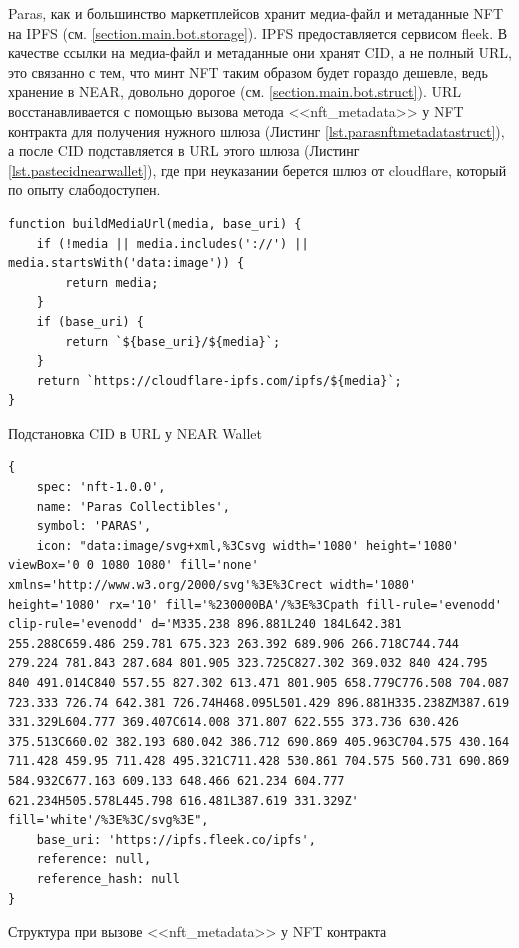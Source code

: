 Paras, как и большинство маркетплейсов хранит медиа-файл и метаданные NFT на IPFS\cite{ipfs} (см. {\color{blue} \ref{section.main.bot.storage}}). IPFS предоставляется сервисом fleek\cite{fleek}. В качестве ссылки на медиа-файл и метаданные они хранят CID, а не полный URL, это связанно с тем, что минт NFT таким образом будет гораздо дешевле, ведь хранение в NEAR, довольно дорогое (см. {\color{blue} \ref{section.main.bot.struct}}). URL восстанавливается с помощью вызова метода <<nft\_metadata>> у NFT контракта для получения нужного шлюза (Листинг {\color{blue}\ref{lst.parasnftmetadatastruct}}), а после CID подставляется в URL этого шлюза (Листинг {\color{blue}\ref{lst.pastecidnearwallet}}), где при неуказании берется шлюз от cloudflare, который по опыту слабодоступен.

\begin{listing}[H]
\begin{verbatim}
function buildMediaUrl(media, base_uri) {
    if (!media || media.includes('://') || media.startsWith('data:image')) {
        return media;
    }
    if (base_uri) {
        return `${base_uri}/${media}`;
    }
    return `https://cloudflare-ipfs.com/ipfs/${media}`;
}
\end{verbatim}
\caption{Подстановка CID в URL у NEAR Wallet\cite{pastecidnearwallet}}
\label{lst.pastecidnearwallet}
\end{listing}

\begin{listing}[H]
\begin{verbatim}
{
    spec: 'nft-1.0.0',
    name: 'Paras Collectibles',
    symbol: 'PARAS',
    icon: "data:image/svg+xml,%3Csvg width='1080' height='1080' viewBox='0 0 1080 1080' fill='none' xmlns='http://www.w3.org/2000/svg'%3E%3Crect width='1080' height='1080' rx='10' fill='%230000BA'/%3E%3Cpath fill-rule='evenodd' clip-rule='evenodd' d='M335.238 896.881L240 184L642.381 255.288C659.486 259.781 675.323 263.392 689.906 266.718C744.744 279.224 781.843 287.684 801.905 323.725C827.302 369.032 840 424.795 840 491.014C840 557.55 827.302 613.471 801.905 658.779C776.508 704.087 723.333 726.74 642.381 726.74H468.095L501.429 896.881H335.238ZM387.619 331.329L604.777 369.407C614.008 371.807 622.555 373.736 630.426 375.513C660.02 382.193 680.042 386.712 690.869 405.963C704.575 430.164 711.428 459.95 711.428 495.321C711.428 530.861 704.575 560.731 690.869 584.932C677.163 609.133 648.466 621.234 604.777 621.234H505.578L445.798 616.481L387.619 331.329Z' fill='white'/%3E%3C/svg%3E",
    base_uri: 'https://ipfs.fleek.co/ipfs',
    reference: null,
    reference_hash: null
}
\end{verbatim}
\caption{Структура при вызове <<nft\_metadata>> у NFT контракта}
\label{lst.parasfunctioncallnftmetadata}
\end{listing}


